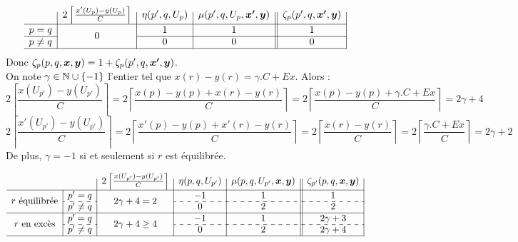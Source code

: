 \documentclass[twoside,11pt,openany,a4paper]{rapport}
\begin{document}
\begin{gather*}
  \begin{array}{c|c|c|c||c|}
    & 2 \left\lceil \frac{x'(U_p)-y(U_p)}{C} \right\rceil
    & \eta(p',q,U_p)
    & \mu(p',q,U_p,\bs{x'},\bs{y})
    & \zeta_p(p',q,\bs{x'},\bs{y})
    \\ \hline
    p=q
    & \multirow{2}{*}{$0$}
    & 1
    & 1
    & 1
    \\ \cline{1-1}\cline{3-5}
    p \ne q
    &
    & 0
    & 0
    & 0
    \\ \hline
  \end{array}
\end{gather*}
Donc $\zeta_p(p,q,\boldsymbol{x},\boldsymbol{y}) = 1 + \zeta_p(p',q,\boldsymbol{x'},\boldsymbol{y})$.
\\

On note $\gamma \in \mathbb{N} \cup \{-1\}$ l'entier tel que $x(r)-y(r)=\gamma. C + Ex$. Alors :
\[
2 \left\lceil \frac{x(U_{p'})-y(U_{p'})}{C} \right\rceil
= 2 \left\lceil \frac{x(p)-y(p)+x(r)-y(r)}{C} \right\rceil
= 2 \left\lceil \frac{x(p)-y(p)+\gamma. C + Ex}{C} \right\rceil
= 2\gamma + 4
\]
\[
2 \left\lceil \frac{x'(U_{p'})-y(U_{p'})}{C} \right\rceil
= 2 \left\lceil \frac{x'(p)-y(p)+x'(r)-y(r)}{C} \right\rceil
= 2 \left\lceil \frac{x(r)-y(r)}{C} \right\rceil
= 2 \left\lceil \frac{\gamma. C + Ex}{C} \right\rceil
= 2\gamma + 2
\]
De plus, $\gamma = -1$ si et seulement si $r$ est équilibrée.

\begin{gather*}
  \begin{array}{c|c|c|c|c||c|}
    \multicolumn{2}{c|}{}
    & 2 \left\lceil \frac{x(U_{p'})-y(U_{p'})}{C} \right\rceil
    & \eta(p,q,U_{p'})
    & \mu(p,q,U_{p'},\bs{x},\bs{y})
    & \zeta_{p'}(p,q,\bs{x},\bs{y})
    \\ \hline
    \multirow{2}{*}{$r$ équilibrée}
    & p'=q
    & \multirow{2}{*}{$2\gamma+4=2$}
    & -1
    & 1
    & 1
    \\ \cdashline{2-2}\cdashline{4-6}
    & p' \ne q
    &
    & 0
    & 2
    & 2
    \\ \hline
    \multirow{2}{*}{$r$ en excès}
    & p'=q
    & \multirow{2}{*}{$2\gamma+4 \ge 4$}
    & -1
    & 1
    & 2\gamma+3
    \\ \cdashline{2-2}\cdashline{4-6}
    & p' \ne q
    &
    & 0
    & 2
    & 2\gamma+4
    \\ \hline
  \end{array}
\end{gather*}
\end{document}
